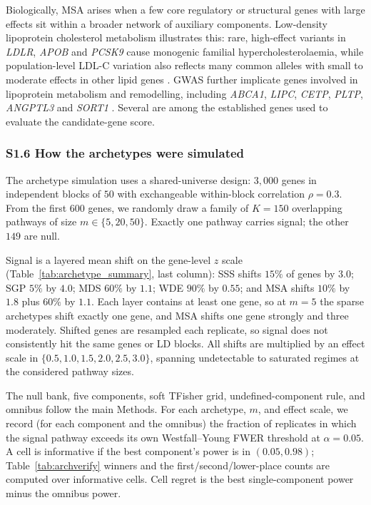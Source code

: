 Biologically, MSA arises when a few core regulatory or structural genes with large effects sit within a broader network of auxiliary components. Low-density lipoprotein cholesterol metabolism illustrates this: rare, high-effect variants in \textit{LDLR}, \textit{APOB} and \textit{PCSK9} cause monogenic familial hypercholesterolaemia, while population-level LDL-C variation also reflects many common alleles with small to moderate effects in other lipid genes \citep{Umlai2025LDLC,Peloso2022WGSbloodlipids}. GWAS further implicate genes involved in lipoprotein metabolism and remodelling, including \textit{ABCA1}, \textit{LIPC}, \textit{CETP}, \textit{PLTP}, \textit{ANGPTL3} and \textit{SORT1} \citep{Chasman2009LipoproteinProfiles}. Several are among the established genes used to evaluate the candidate-gene score.

\subsubsection*{S1.6 How the archetypes were simulated}

The archetype simulation uses a shared-universe design: $3{,}000$ genes in independent blocks of $50$ with exchangeable within-block correlation $\rho=0.3$. From the first $600$ genes, we randomly draw a family of $K=150$ overlapping pathways of size $m\in\{5,20,50\}$. Exactly one pathway carries signal; the other $149$ are null.

Signal is a layered mean shift on the gene-level $z$ scale (Table~\ref{tab:archetype_summary}, last column): SSS shifts $15\%$ of genes by $3.0$; SGP $5\%$ by $4.0$; MDS $60\%$ by $1.1$; WDE $90\%$ by $0.55$; and MSA shifts $10\%$ by $1.8$ plus $60\%$ by $1.1$. Each layer contains at least one gene, so at $m=5$ the sparse archetypes shift exactly one gene, and MSA shifts one gene strongly and three moderately. Shifted genes are resampled each replicate, so signal does not consistently hit the same genes or LD blocks. All shifts are multiplied by an effect scale in $\{0.5,1.0,1.5,2.0,2.5,3.0\}$, spanning undetectable to saturated regimes at the considered pathway sizes.

The null bank, five components, soft TFisher grid, undefined-component rule, and omnibus follow the main Methods. For each archetype, $m$, and effect scale, we record (for each component and the omnibus) the fraction of replicates in which the signal pathway exceeds its own Westfall--Young FWER threshold at $\alpha=0.05$. A cell is informative if the best component’s power is in $(0.05,0.98)$; Table~\ref{tab:archverify} winners and the first/second/lower-place counts are computed over informative cells. Cell regret is the best single-component power minus the omnibus power.
